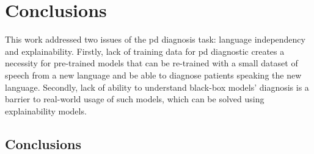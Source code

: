 
\chapter{Conclusions}
\label{ch:magna}



This work addressed two issues of the \gls{pd} diagnosis task: language independency and explainability. Firstly, lack of training data for \gls{pd} diagnostic creates a necessity for pre-trained models that can be re-trained with a small dataset of speech from a new language and be able to diagnose patients speaking the new language. Secondly, lack of ability to understand black-box models' diagnosis is a barrier to real-world usage of such models, which can be solved using explainability models.

\section{Conclusions}

